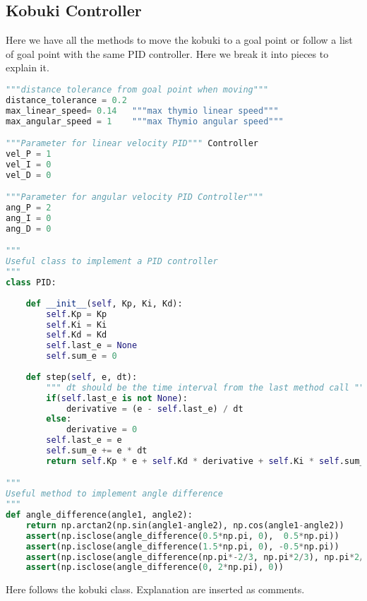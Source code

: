 \subsection*{Kobuki Controller}
Here we have all the methods to move the kobuki to a goal point or follow a list of goal point with the same PID controller. Here we break it into pieces to explain it.
\begin{lstlisting}[caption={Kobuki PID Controller},label={lst:kobukicontroller},language=Python]
"""distance tolerance from goal point when moving"""
distance_tolerance = 0.2 
max_linear_speed= 0.14   """max thymio linear speed"""
max_angular_speed = 1    """max Thymio angular speed"""

"""Parameter for linear velocity PID""" Controller
vel_P = 1
vel_I = 0
vel_D = 0

"""Parameter for angular velocity PID Controller"""
ang_P = 2
ang_I = 0
ang_D = 0

"""
Useful class to implement a PID controller
"""
class PID:
    
    def __init__(self, Kp, Ki, Kd):
        self.Kp = Kp
        self.Ki = Ki
        self.Kd = Kd
        self.last_e = None
        self.sum_e = 0
        
    def step(self, e, dt):
        """ dt should be the time interval from the last method call """
        if(self.last_e is not None):
            derivative = (e - self.last_e) / dt
        else:
            derivative = 0
        self.last_e = e
        self.sum_e += e * dt
        return self.Kp * e + self.Kd * derivative + self.Ki * self.sum_e

"""
Useful method to implement angle difference
"""
def angle_difference(angle1, angle2):
    return np.arctan2(np.sin(angle1-angle2), np.cos(angle1-angle2))
    assert(np.isclose(angle_difference(0.5*np.pi, 0),  0.5*np.pi))
    assert(np.isclose(angle_difference(1.5*np.pi, 0), -0.5*np.pi))
    assert(np.isclose(angle_difference(np.pi*-2/3, np.pi*2/3), np.pi*2/3))
    assert(np.isclose(angle_difference(0, 2*np.pi), 0))
\end{lstlisting}
Here follows the kobuki class. Explanation are inserted as comments.
